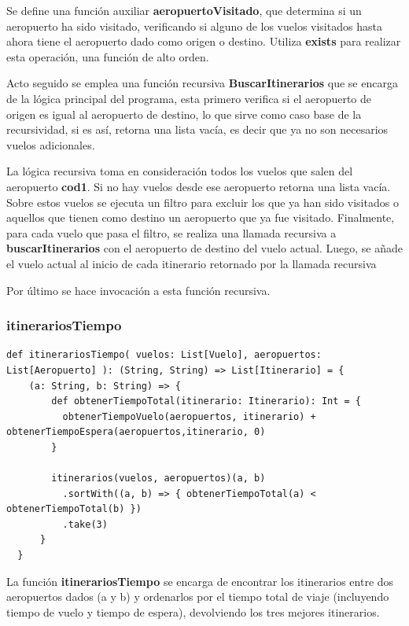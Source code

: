 \documentclass[letterpaper]{article}
\begin{document}
Se define una función auxiliar \textbf{aeropuertoVisitado}, que determina si un aeropuerto ha sido visitado, verificando si alguno de los vuelos visitados hasta ahora tiene el aeropuerto dado como origen o destino. Utiliza \textbf{exists} para realizar esta operación, una función de alto orden.

Acto seguido se emplea una función recursiva \textbf{BuscarItinerarios} que se encarga de la lógica principal del programa, esta primero verifica si el aeropuerto de origen es igual al aeropuerto de destino, lo que sirve como caso base de la recursividad, si es así, retorna una lista vacía, es decir que ya no son necesarios vuelos adicionales.

La lógica recursiva toma en consideración todos los vuelos que salen del aeropuerto \textbf{cod1}. Si no hay vuelos desde ese aeropuerto retorna una lista vacía. Sobre estos vuelos se ejecuta un filtro para excluir los que ya han sido visitados o aquellos que tienen como destino un aeropuerto que ya fue visitado. Finalmente, para cada vuelo que pasa el filtro, se realiza una llamada recursiva a \textbf{buscarItinerarios} con el aeropuerto de destino del vuelo actual. Luego, se añade el vuelo actual al inicio de cada itinerario retornado por la llamada recursiva

Por último se hace invocación a esta función recursiva.


\subsubsection{itinerariosTiempo}

\begin{lstlisting}[caption={Función para minimizar el tiempo total de viaje}, label={lst:itinerariosTiempo}, captionpos=b]
  def itinerariosTiempo( vuelos: List[Vuelo], aeropuertos: List[Aeropuerto] ): (String, String) => List[Itinerario] = {
    (a: String, b: String) => {
        def obtenerTiempoTotal(itinerario: Itinerario): Int = {
          obtenerTiempoVuelo(aeropuertos, itinerario) + obtenerTiempoEspera(aeropuertos,itinerario, 0)
        }

        itinerarios(vuelos, aeropuertos)(a, b)
          .sortWith((a, b) => { obtenerTiempoTotal(a) < obtenerTiempoTotal(b) })
          .take(3)
      }
  }
\end{lstlisting}

La función \textbf{itinerariosTiempo} se encarga de encontrar los itinerarios entre dos aeropuertos dados (a y b) y ordenarlos por el tiempo total de viaje (incluyendo tiempo de vuelo y tiempo de espera), devolviendo los tres mejores itinerarios.
\end{document}

